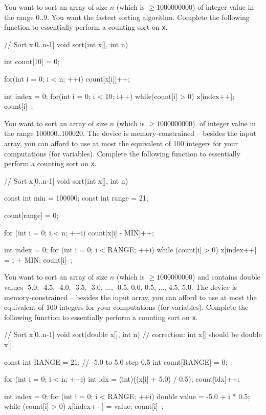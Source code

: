 

\nextq
You want to sort an array of size $n$ (which is $\geq 1000000000$)
of integer value in the range 0..9.
You want the fastest sorting algorithm.
Complete the following function to essentially perform a counting sort on \verb!x!.
\\
\ANSWER
\begin{answercode}
// Sort x[0..n-1]
void sort(int x[], int n)
{
  int count[10] = {0};

  for(int i = 0; i < n; ++i)
  {
    count[x[i]]++;
  }

  int index = 0;
  for(int i = 0; i < 10; i++)
  {
    while(count[i] > 0)
    {
      x[index++];
      count[i]--;
    }
  }
}
\end{answercode}

\nextq
You want to sort an array of size $n$ (which is $\geq 1000000000$).
of integer value in the range 100000..100020.
The device is memory-constrained -- besides the input array,
you can afford to use at most
the equivalent of 100 integers for your computations (for variables).
Complete the following function to essentially perform a counting sort on \verb!x!.
\\
\ANSWER
\begin{answercode}
// Sort x[0..n-1]
void sort(int x[], int n)
{
  const int min = 100000;
  const int range = 21;

  count[range] = 0;

  for (int i = 0; i < n; ++i)
  {
    count[x[i] - MIN]++;
  }

  int index = 0;
  for (int i = 0; i < RANGE; ++i)
  {
    while (count[i] > 0)
    {
      x[index++] = i + MIN;
      count[i]--;
    }
  }
}
\end{answercode}

\nextq
You want to sort an array of size $n$ (which is $\geq 1000000000$)
and contains
double values -5.0, -4.5, -4.0, -3.5, -3.0, ..., -0.5, 0.0, 0.5, ..., 4.5, 5.0.
The device is memory-constrained -- besides the input array,
you can afford to use at most
the equivalent of 100 integers for your computations (for variables).
Complete the following function to essentially perform a counting sort on \verb!x!.
\\
\ANSWER
\begin{answercode}
// Sort x[0..n-1]
void sort(double x[], int n) // correction: int x[] should be double x[].
{
  const int RANGE = 21; // -5.0 to 5.0 step 0.5
  int count[RANGE] = {0};

  for (int i = 0; i < n; ++i)
  {
    int idx = (int)((x[i] + 5.0) / 0.5);
    count[idx]++;
  }

  int index = 0;
  for (int i = 0; i < RANGE; ++i)
  {
    double value = -5.0 + i * 0.5;
    while (count[i] > 0)
    {
      x[index++] = value;
      count[i]--;
    }
  }
}
\end{answercode}


